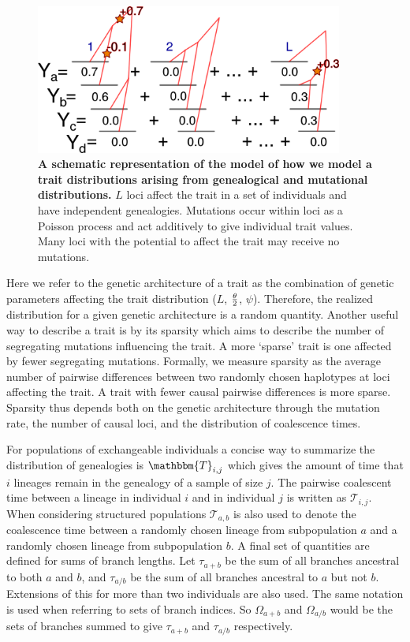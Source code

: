 \begin{figure}
  \centering
  \includegraphics[width=0.9\textwidth]{./figures/schema.png}

  \caption{\textbf{A schematic representation of the model of how we model a
  trait distributions arising from genealogical and mutational distributions.}
  $L$ loci affect the trait in a set of individuals and have independent
  genealogies. Mutations occur within loci as a Poisson process and act
  additively to give individual trait values. Many loci with the potential to
  affect the trait may receive no mutations.}

  \label{fig:schema}
\end{figure}

Here we refer to the genetic architecture of a trait as the combination of
genetic parameters affecting the trait distribution ($L$, $\frac{\theta}{2}$, $\psi$).
Therefore, the realized distribution for a given genetic architecture is a
random quantity. Another useful way to describe a trait is by its sparsity which
aims to describe the number of segregating mutations influencing the trait. A
more `sparse' trait is one affected by fewer segregating mutations. Formally, we
measure sparsity as the average number of pairwise differences between two
randomly chosen haplotypes at loci affecting the trait. A trait with fewer
causal pairwise differences is more sparse. Sparsity thus depends both on the
genetic architecture through the mutation rate, the number of causal loci, and
the distribution of coalescence times.

For populations of exchangeable individuals a concise way to summarize the
distribution of genealogies is $\mathbbm{T}_{i,j}$ which gives the amount of
time that $i$ lineages remain in the genealogy of a sample of size $j$. The
pairwise coalescent time between a lineage in individual $i$ and in individual
$j$ is written as $\mathcal{T}_{i,j}$. When considering structured populations
$\mathcal{T}_{a,b}$ is also used to denote the coalescence time between a
randomly chosen lineage from subpopulation $a$ and a randomly chosen lineage
from subpopulation $b$. A final set of quantities are defined for sums of branch
lengths. Let $\tau_{a+b}$ be the sum of all branches ancestral to both $a$ and
$b$, and $\tau_{a/b}$ be the sum of all branches ancestral to $a$ but not $b$.
Extensions of this for more than two individuals are also used. The same
notation is used when referring to sets of branch indices. So $\Omega_{a+b}$ and
$\Omega_{a/b}$ would be the sets of branches summed to give $\tau_{a+b}$ and
$\tau_{a/b}$ respectively.

